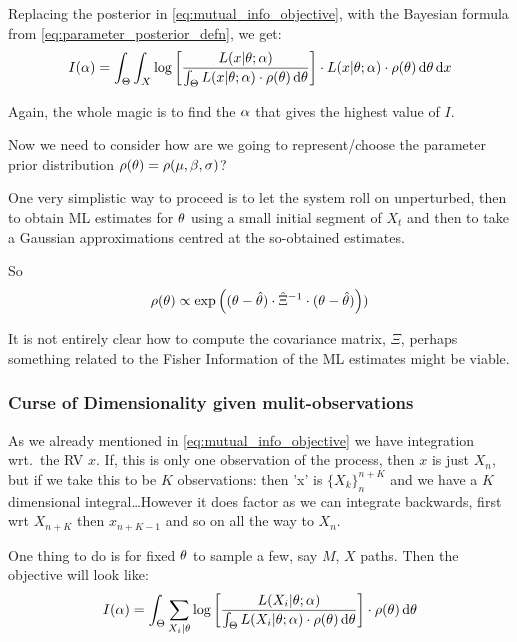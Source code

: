 \documentclass{article}
\begin{document}
Replacing the posterior in \cref{eq:mutual_info_objective}, with the Bayesian
formula from \cref{eq:parameter_posterior_defn}, we get:
\begin{equation}
I({\alpha}) = \int_\Theta \int_X  \log\left[\frac{L(x|{\theta}; {\alpha})}
										{\int_\Theta L(x|{\theta};{\alpha})\cdot \rho({\theta}) \, \mathrm{d} {\theta}} \right] \cdot L(x|
										{\theta};{\alpha}) \cdot \rho({\theta}) \, \mathrm{d} {\theta} \, \mathrm{d} x
\label{eq:mutual_info_objective_posteriored}
\end{equation}

Again, the whole magic is to find the ${\alpha}$ that gives the highest value of $I$.

Now we need to consider how are we going to represent/choose the parameter prior
distribution $\rho({\theta}) = \rho({\mu },{\beta},{\sigma })$? 

One very simplistic way to proceed is to let the system roll on unperturbed,
then to obtain ML estimates for ${\theta}$ using a small initial segment of $X_t$
and then to take a Gaussian approximations centred at the so-obtained estimates. 
 
So  
\begin{equation}
\rho({\theta}) \propto 
\exp\left( ({\theta} - \hat{{\theta}}) \cdot \hat\Xi^{-1} \cdot ({\theta}-\hat{{\theta}})\right))
\label{eq:prior_gaussian_approxmn}
\end{equation}

It is not entirely clear how to compute the covariance matrix, $\Xi$, perhaps
something related to the Fisher Information of the ML estimates might be viable. 

 \subsubsection{Curse of Dimensionality given mulit-observations}

As we already mentioned in \cref{eq:mutual_info_objective} we have integration
wrt.\ the RV $x$. If, this is only one observation of the process, then $x$ is
just $X_n$, but if we take this to be $K$ observations: then 'x' is
$\{X_k\}_n^{n+K}$ and we have a $K$ dimensional integral\ldots However it does
factor as we can integrate backwards, first wrt $X_{n+K}$ then $x_{n+K-1}$ and
so on all the way to $X_{n}$.

One thing to do is for fixed ${\theta}$ to sample a few, say $M$, $X$ paths. Then the
objective will look like:
\begin{equation}
I({\alpha}) = \int_\Theta \sum_{X_i|{\theta}}  \log\left[\frac{L(X_i|{\theta}; {\alpha})}
										{\int_\Theta L(X_i|{\theta};{\alpha})\cdot \rho({\theta})\, \mathrm{d} {\theta}} \right]
										 \cdot \rho({\theta}) \, \mathrm{d} {\theta}
\label{eq:mutual_info_objective_particlized}
\end{equation}
\end{document}
